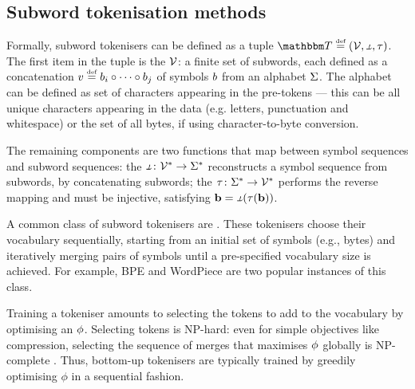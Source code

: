 
\subsection{Subword tokenisation methods}\label{sec:12-subwordmethods}

Formally, subword tokenisers can be defined as a tuple $\tokeniser \defeq (\vocab, \detok, \tok)$. The first item in the tuple is the  $\mathcal{V}$: a finite set of subwords, each defined as a concatenation $v \mathrel{\stackrel{\textnormal{\tiny def}}{=}} b_i \circ \cdots \circ b_j$ of symbols $b$ from an alphabet $\Sigma$. The alphabet can be defined as set of characters appearing in the pre-tokens --- this can be all unique characters appearing in the data (e.g. letters, punctuation and whitespace) or the set of all bytes, if using character-to-byte conversion. %

The remaining components are two functions that map between symbol sequences and subword sequences: the  $\detok\colon \vocab^* \to \alphabet^*$ reconstructs a symbol sequence from subwords, by concatenating subwords; the  $\tau\colon \Sigma^* \to \mathcal{V}^*$ performs the reverse mapping and must be injective, satisfying $\chvec = \detok(\tok(\chvec))$.

A common class of subword tokenisers are . These tokenisers choose their vocabulary sequentially, starting from an initial set of symbols (e.g., bytes) and iteratively merging pairs of symbols until a pre-specified vocabulary size is achieved. For example, BPE \citep{gage1994new,sennrich-etal-2016-bpe} and WordPiece \citep{schuster-nakajima-2012-voice} are two popular instances of this class.

Training a tokeniser amounts to selecting the tokens to add to the vocabulary by optimising an  $\phi$. Selecting tokens is NP-hard: even for simple objectives like compression, selecting the sequence of merges that maximises $\phi$ globally is NP-complete \citep{kozma-etal-2024-theoretical, whittington2024tokenisation}. Thus, bottom-up tokenisers are typically trained by greedily optimising $\phi$ in a sequential fashion.

